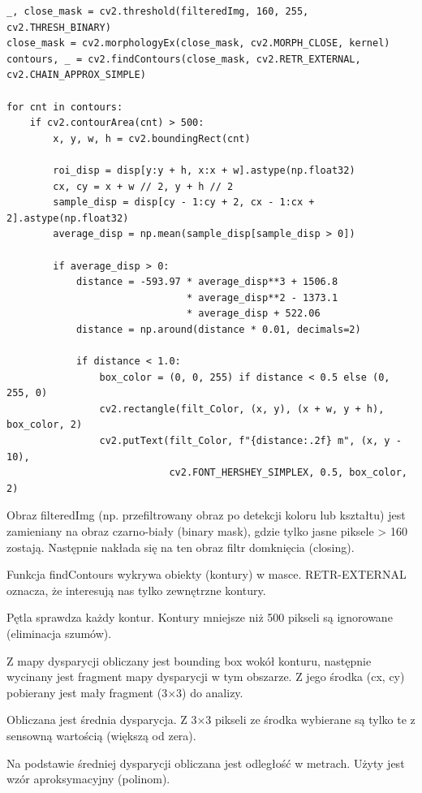 \documentclass[magisterska]{pracadypl}
\begin{document}
\begin{lstlisting}[style=mypython]
_, close_mask = cv2.threshold(filteredImg, 160, 255, cv2.THRESH_BINARY)
close_mask = cv2.morphologyEx(close_mask, cv2.MORPH_CLOSE, kernel)
contours, _ = cv2.findContours(close_mask, cv2.RETR_EXTERNAL, cv2.CHAIN_APPROX_SIMPLE)

for cnt in contours:
    if cv2.contourArea(cnt) > 500:
        x, y, w, h = cv2.boundingRect(cnt)

        roi_disp = disp[y:y + h, x:x + w].astype(np.float32)
        cx, cy = x + w // 2, y + h // 2
        sample_disp = disp[cy - 1:cy + 2, cx - 1:cx + 2].astype(np.float32)
        average_disp = np.mean(sample_disp[sample_disp > 0])

        if average_disp > 0:
            distance = -593.97 * average_disp**3 + 1506.8 
                               * average_disp**2 - 1373.1 
                               * average_disp + 522.06
            distance = np.around(distance * 0.01, decimals=2)

            if distance < 1.0:
                box_color = (0, 0, 255) if distance < 0.5 else (0, 255, 0)
                cv2.rectangle(filt_Color, (x, y), (x + w, y + h), box_color, 2)
                cv2.putText(filt_Color, f"{distance:.2f} m", (x, y - 10),
                            cv2.FONT_HERSHEY_SIMPLEX, 0.5, box_color, 2)
\end{lstlisting}

Obraz filteredImg (np. przefiltrowany obraz po detekcji koloru lub kształtu) jest zamieniany na obraz czarno-biały (binary mask), gdzie tylko jasne piksele > 160 zostają. Następnie nakłada się na ten obraz filtr domknięcia (closing).

Funkcja findContours wykrywa obiekty (kontury) w masce. RETR-EXTERNAL oznacza, że interesują nas tylko zewnętrzne kontury.

Pętla sprawdza każdy kontur. Kontury mniejsze niż 500 pikseli są ignorowane (eliminacja szumów).

Z mapy dysparycji obliczany jest bounding box wokół konturu, następnie wycinany jest fragment mapy dysparycji w tym obszarze. Z jego środka (cx, cy) pobierany jest mały fragment (3×3) do analizy.

Obliczana jest średnia dysparycja. Z 3×3 pikseli ze środka wybierane są tylko te z sensowną wartością (większą od zera).

Na podstawie średniej dysparycji obliczana jest odległość w metrach. Użyty jest wzór aproksymacyjny (polinom).
\end{document}

